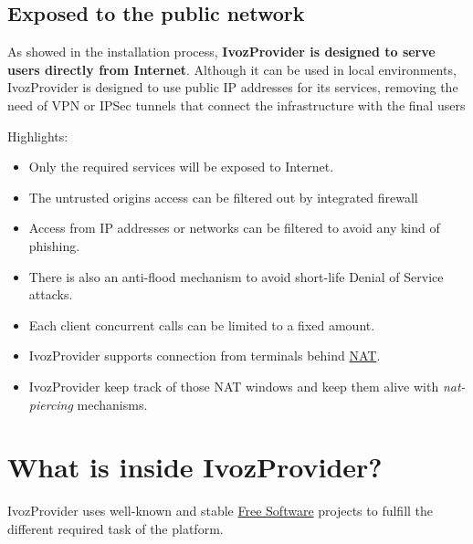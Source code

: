 \documentclass[letterpaper,10pt,spanish]{sphinxmanual}
\begin{document}
\subsection{Exposed to the public network}
\label{basic_concepts/intro/what_is_ivozprovider:exposed-to-the-public-network}\label{basic_concepts/intro/what_is_ivozprovider:exposed}
As showed in the installation process, \textbf{IvozProvider is designed to serve
users directly from Internet}. Although it can be used in local
environments, IvozProvider is designed to use public IP addresses for its
services, removing the need of VPN or IPSec tunnels that connect the
infrastructure with the final users

Highlights:
\begin{itemize}
\item {} 
Only the required services will be exposed to Internet.

\item {} 
The untrusted origins access can be filtered out by integrated firewall

\item {} 
Access from IP addresses or networks can be filtered to avoid any kind of
phishing.

\item {} 
There is also an anti-flood mechanism to avoid short-life Denial of
Service attacks.

\item {} 
Each client concurrent calls can be limited to a fixed amount.

\item {} 
IvozProvider supports connection from terminals behind
\href{https://en.wikipedia.org/wiki/Network\_address\_translation}{NAT}.

\item {} 
IvozProvider keep track of those NAT windows and keep them alive with
\emph{nat-piercing} mechanisms.

\end{itemize}


\section{What is inside IvozProvider?}
\label{basic_concepts/intro/what_is_inside::doc}\label{basic_concepts/intro/what_is_inside:what-is-inside-ivozprovider}
IvozProvider uses well-known and stable \href{https://www.gnu.org/philosophy/free-sw.en.html}{Free Software} projects to fulfill
the different required task of the platform.
\end{document}
